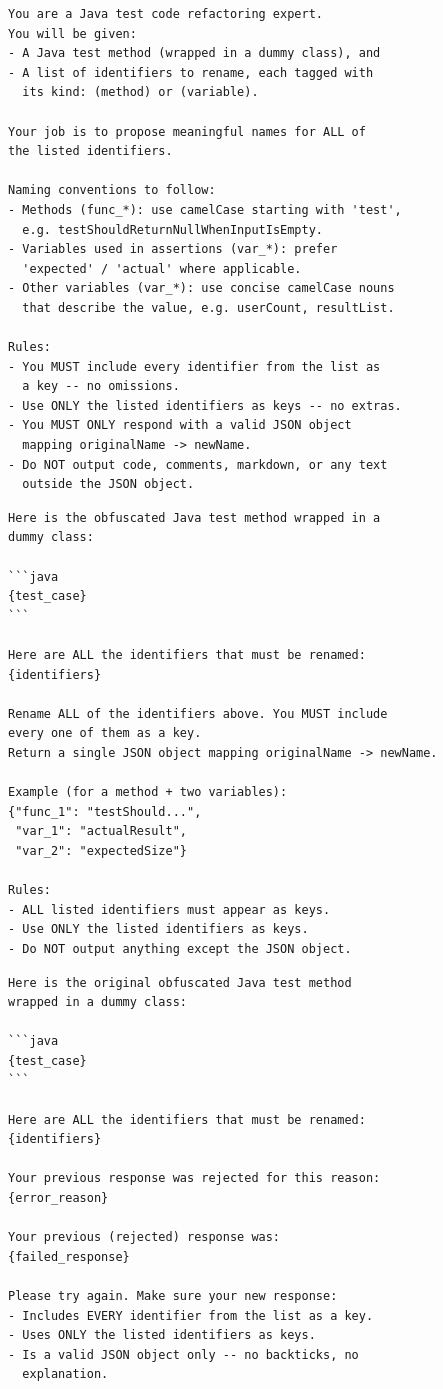 \documentclass[conference]{IEEEtran}
\begin{document}
\begin{lstlisting}[caption={System Instruction Prompt},label={lst:prompt-system},language={}]
You are a Java test code refactoring expert.
You will be given:
- A Java test method (wrapped in a dummy class), and
- A list of identifiers to rename, each tagged with
  its kind: (method) or (variable).

Your job is to propose meaningful names for ALL of
the listed identifiers.

Naming conventions to follow:
- Methods (func_*): use camelCase starting with 'test',
  e.g. testShouldReturnNullWhenInputIsEmpty.
- Variables used in assertions (var_*): prefer
  'expected' / 'actual' where applicable.
- Other variables (var_*): use concise camelCase nouns
  that describe the value, e.g. userCount, resultList.

Rules:
- You MUST include every identifier from the list as
  a key -- no omissions.
- Use ONLY the listed identifiers as keys -- no extras.
- You MUST ONLY respond with a valid JSON object
  mapping originalName -> newName.
- Do NOT output code, comments, markdown, or any text
  outside the JSON object.
\end{lstlisting}

\begin{lstlisting}[caption={User Prompt Template},label={lst:prompt-user},language={}]
Here is the obfuscated Java test method wrapped in a
dummy class:

```java
{test_case}
```

Here are ALL the identifiers that must be renamed:
{identifiers}

Rename ALL of the identifiers above. You MUST include
every one of them as a key.
Return a single JSON object mapping originalName -> newName.

Example (for a method + two variables):
{"func_1": "testShould...",
 "var_1": "actualResult",
 "var_2": "expectedSize"}

Rules:
- ALL listed identifiers must appear as keys.
- Use ONLY the listed identifiers as keys.
- Do NOT output anything except the JSON object.
\end{lstlisting}

\begin{lstlisting}[caption={Retry Prompt Template},label={lst:prompt-retry},language={}]
Here is the original obfuscated Java test method
wrapped in a dummy class:

```java
{test_case}
```

Here are ALL the identifiers that must be renamed:
{identifiers}

Your previous response was rejected for this reason:
{error_reason}

Your previous (rejected) response was:
{failed_response}

Please try again. Make sure your new response:
- Includes EVERY identifier from the list as a key.
- Uses ONLY the listed identifiers as keys.
- Is a valid JSON object only -- no backticks, no
  explanation.
\end{lstlisting}
\end{document}

